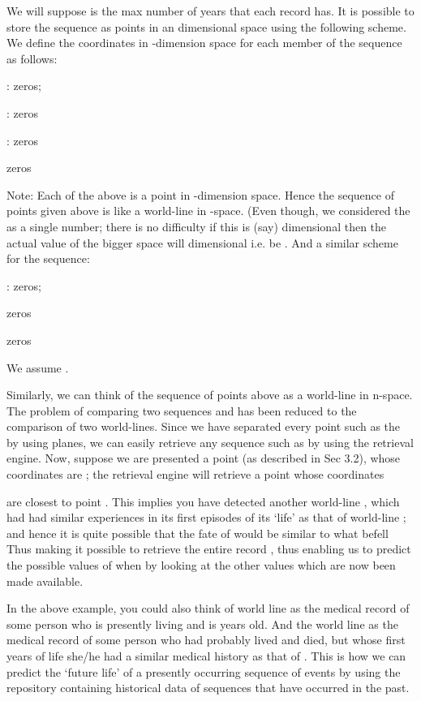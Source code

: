 \documentclass[english]{article}
\begin{document}
We will suppose is the max number of years that each record has.
It is possible to store the sequence as points in an  dimensional
space using the following scheme. We define the coordinates in -dimension
space for each member of the sequence as follows:

 : \qquad{}\qquad{} zeros;

:\qquad{}\qquad{} zeros

: \qquad{}\qquad{}  zeros 



 \qquad{}\qquad{} zeros 

\medskip{}


Note: Each of the above is a point in -dimension space. Hence
the sequence of points given above is like a world-line in -space.
(Even though, we considered the  as a single number; there
is no difficulty if this is (say)  dimensional \textendash{} then
the actual value of the bigger space will  dimensional i.e.
be  . And a similar scheme for the sequence:

:\qquad{}\qquad{} zeros;

\qquad{}\qquad{}  zeros

\qquad{}\qquad{}  zeros



\qquad{}\qquad{} We assume .

\medskip{}


Similarly, we can think of the sequence of points above as a world-line
in n-space. The problem of comparing two sequences  and  has
been reduced to the comparison of two world-lines. Since we have separated
every point such as the  by using
planes, we can easily retrieve any sequence such as  by using
the retrieval engine. Now, suppose we are presented a point  (as
described in Sec 3.2), whose coordinates are 
; the retrieval engine will retrieve a point  whose coordinates

are closest to point . This implies you have detected another
world-line , which had had similar experiences in its first
episodes of its `life' as that of world-line ; and hence it is
quite possible that the fate of  would be similar to what befell
 Thus making it possible to retrieve the entire record ,
thus enabling us to predict the possible values of  when 
by looking at the other values 
which are now been made available. 

\medskip{}


In the above example, you could also think of world line  as the
medical record of some person who is presently living and is 
years old. And the world line  as the medical record of some person
who had probably lived and died, but whose first  years of life she/he
had a similar medical history as that of . This is how we can
predict the `future life' of a presently occurring sequence of events
by using the repository containing historical data of sequences that
have occurred in the past.
\end{document}
